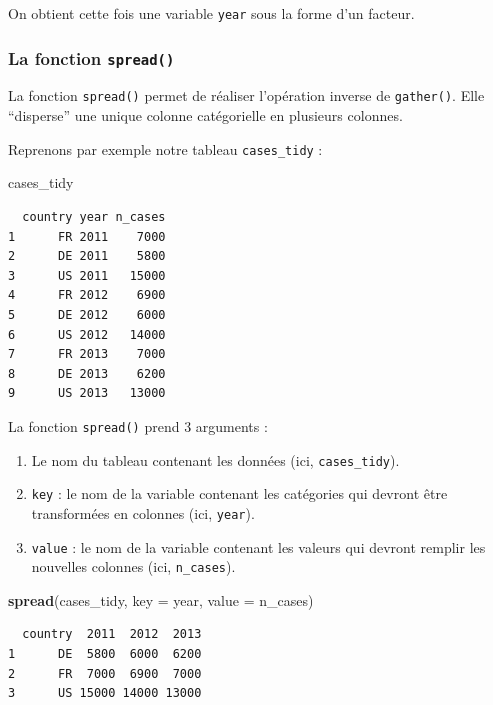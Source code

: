 \documentclass[a4paperpaper,]{article}
\newenvironment{Shaded}{\begin{snugshade}}{\end{snugshade}}
\newcommand{\DataTypeTok}[1]{\textcolor[rgb]{0.00,0.34,0.68}{#1}}
\newcommand{\KeywordTok}[1]{\textcolor[rgb]{0.12,0.11,0.11}{\textbf{#1}}}
\newcommand{\NormalTok}[1]{\textcolor[rgb]{0.12,0.11,0.11}{#1}}
\providecommand{\tightlist}{%
  \setlength{\itemsep}{0pt}\setlength{\parskip}{0pt}}
\begin{document}
On obtient cette fois une variable \texttt{year} sous la forme d'un facteur.

\hypertarget{spread}{%
\subsubsection{\texorpdfstring{La fonction \texttt{spread()}}{La fonction spread()}}\label{spread}}

La fonction \texttt{spread()} permet de réaliser l'opération inverse de \texttt{gather()}. Elle ``disperse'' une unique colonne catégorielle en plusieurs colonnes.

Reprenons par exemple notre tableau \texttt{cases\_tidy} :

\begin{Shaded}
\begin{Highlighting}[]
\NormalTok{cases_tidy}
\end{Highlighting}
\end{Shaded}

\begin{verbatim}
  country year n_cases
1      FR 2011    7000
2      DE 2011    5800
3      US 2011   15000
4      FR 2012    6900
5      DE 2012    6000
6      US 2012   14000
7      FR 2013    7000
8      DE 2013    6200
9      US 2013   13000
\end{verbatim}

La fonction \texttt{spread()} prend 3 arguments :

\begin{enumerate}
\def\labelenumi{\arabic{enumi}.}
\tightlist
\item
  Le nom du tableau contenant les données (ici, \texttt{cases\_tidy}).
\item
  \texttt{key} : le nom de la variable contenant les catégories qui devront être transformées en colonnes (ici, \texttt{year}).
\item
  \texttt{value} : le nom de la variable contenant les valeurs qui devront remplir les nouvelles colonnes (ici, \texttt{n\_cases}).
\end{enumerate}

\begin{Shaded}
\begin{Highlighting}[]
\KeywordTok{spread}\NormalTok{(cases_tidy, }\DataTypeTok{key =}\NormalTok{ year, }\DataTypeTok{value =}\NormalTok{ n_cases)}
\end{Highlighting}
\end{Shaded}

\begin{verbatim}
  country  2011  2012  2013
1      DE  5800  6000  6200
2      FR  7000  6900  7000
3      US 15000 14000 13000
\end{verbatim}
\end{document}
